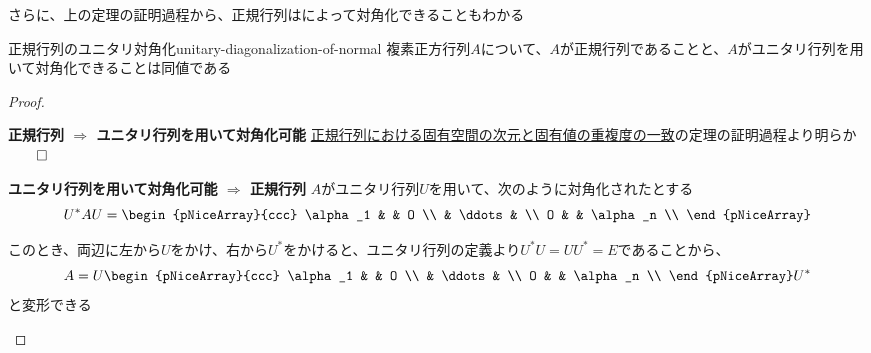 \documentclass[../../../topic_linear-algebra]{subfiles}
\begin{document}
さらに、上の定理の証明過程から、正規行列はによって対角化できることもわかる

\begin{theorem}{正規行列のユニタリ対角化}{unitary-diagonalization-of-normal}
  複素正方行列$A$について、$A$が正規行列であることと、$A$がユニタリ行列を用いて対角化できることは同値である
\end{theorem}

\begin{proof}
  \begin{subpattern}{\bfseries 正規行列 $\Longrightarrow$ ユニタリ行列を用いて対角化可能}
    \hyperref[thm:normal-matrix-eigenvalue-multiplicity]{正規行列における固有空間の次元と固有値の重複度の一致}の定理の証明過程より明らか $\qed$
  \end{subpattern}

  \begin{subpattern}{\bfseries ユニタリ行列を用いて対角化可能 $\Longrightarrow$ 正規行列}
    $A$がユニタリ行列$U$を用いて、次のように対角化されたとする
    \begin{equation*}
      U^* AU =  \begin{pNiceArray}{ccc}
        \alpha_1 & & O \\
        &  \ddots & \\
        O & & \alpha_n \\
      \end{pNiceArray}
    \end{equation*}

    このとき、両辺に左から$U$をかけ、右から$U^*$をかけると、ユニタリ行列の定義より$U^*U = UU^* = E$であることから、
    \begin{equation*}
      A = U \begin{pNiceArray}{ccc}
        \alpha_1 & & O \\
        &  \ddots & \\
        O & & \alpha_n \\
      \end{pNiceArray} U^*
    \end{equation*}
    と変形できる

    \br


\end{subpattern}
\end{proof}
\end{document}
